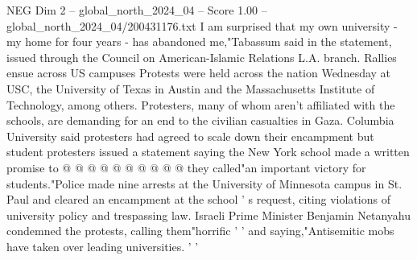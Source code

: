 \begin{textsample}{NEG Dim 2 – global\_north\_2024\_04 – Score 1.00 – global\_north\_2024\_04/200431176.txt}
I am surprised that my own university - my home for four years - has abandoned me,"Tabassum said in the statement, issued through the Council on American-Islamic Relations L.A. branch.
Rallies ensue across US campuses Protests were held across the nation Wednesday at USC, the University of Texas in Austin and the Massachusetts Institute of Technology, among others.
Protesters, many of whom aren't affiliated with the schools, are demanding for an end to the civilian casualties in Gaza.
Columbia University said protesters had agreed to scale down their encampment but student protesters issued a statement saying the New York school made a written promise to @ @ @ @ @ @ @ @ @ @ they called"an important victory for students."Police made nine arrests at the University of Minnesota campus in St.
Paul and cleared an encampment at the school ' s request, citing violations of university policy and trespassing law.
Israeli Prime Minister Benjamin Netanyahu condemned the protests, calling them"horrific ' ' and saying,"Antisemitic mobs have taken over leading universities. ' '

\end{textsample}
